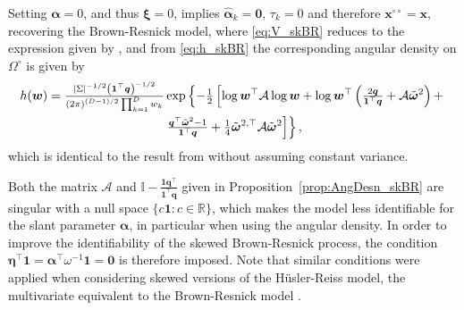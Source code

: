\documentclass[lineno]{biometrika}
\begin{document}
\begin{corollary}
\label{cor:BR}
Setting $\bm \alpha = 0$, and thus $\bm \xi=0$, implies $\hat{\bm \alpha}_k = \bm 0$, $\tau_k=0$ and therefore $\bm x^{\circ\circ} = \bm x$, recovering the Brown-Resnick model, where \eqref{eq:V_skBR} reduces to the expression given by \citet{Huser.Davison:2013a}, and from \eqref{eq:h_skBR} the corresponding angular density on $\Omega^\circ$ is given by
%
\begin{multline}
\label{eq:h_BR}
h(\bm w) ={\textstyle{| \Sigma |^{-1/2} \left( \bm 1^\top \bm q\right)^{-1/2}\over\left( 2\pi \right)^{(D-1)/2}\prod_{k=1}^D w_k}}\exp \left\{ -{\textstyle{1\over2}} \left[ \log \bm w^{\top} \mathcal{A} \log \bm w + \log \bm w^{\top} \left( {\textstyle{2 \bm q\over\bm 1^\top \bm q}} + {\mathcal A}\tilde{\bm\omega}^2\right) + \right.\right. \\ \left.\left. {\textstyle{\bm q^\top\tilde{\bm \omega}^2 - 1\over\bm 1 ^\top \bm q}} + {\textstyle{1\over4}}\tilde{\bm\omega}^{2,\top}{\mathcal A}\tilde{\bm\omega}^2 \right]\right\},
\end{multline}%
%
which is identical to the result from \citet{Wadsworth.Tawn:2014} without assuming constant variance.
\end{corollary}

Both the matrix $\mathcal{A}$ and $\mathbb{I} - \frac{\bm 1\bm q^\top}{\bm 1^\top \bm q}$ given in Proposition~\ref{prop:AngDesn_skBR} are singular with a null space $\{c\bm 1:c\in\mathbb R\}$, which makes the model less identifiable for the slant parameter $\bm \alpha$, in particular when using the angular density. In order to improve the identifiability of the skewed Brown-Resnick process, 
the condition $\bm \eta^\top \bm 1 = \bm \alpha^\top \omega^{-1}  \bm 1 = \bm 0$ is therefore imposed. Note that similar conditions were applied when considering skewed versions of the H\"{u}sler-Reiss model, the multivariate equivalent to the Brown-Resnick model \citep{Padoan:2011, Beranger.etal:2019}.
\end{document}

